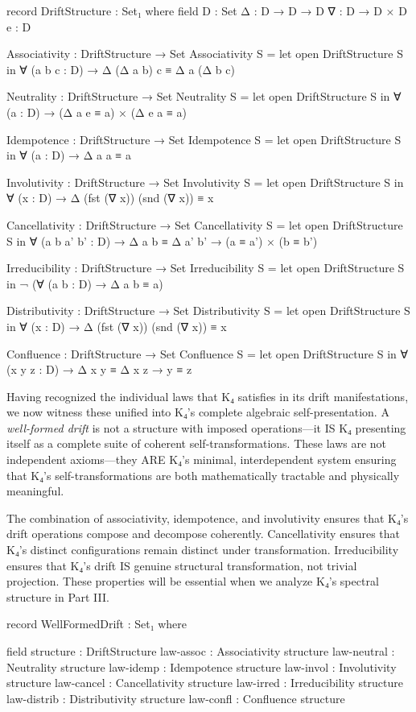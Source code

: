 \documentclass[11pt,a4paper]{book}
\begin{document}
\begin{code}
record DriftStructure : Set₁ where
  field
    D : Set
    Δ : D → D → D
    ∇ : D → D × D
    e : D

Associativity : DriftStructure → Set
Associativity S = let open DriftStructure S in
  ∀ (a b c : D) → Δ (Δ a b) c ≡ Δ a (Δ b c)

Neutrality : DriftStructure → Set
Neutrality S = let open DriftStructure S in
  ∀ (a : D) → (Δ a e ≡ a) × (Δ e a ≡ a)

Idempotence : DriftStructure → Set
Idempotence S = let open DriftStructure S in
  ∀ (a : D) → Δ a a ≡ a

Involutivity : DriftStructure → Set
Involutivity S = let open DriftStructure S in
  ∀ (x : D) → Δ (fst (∇ x)) (snd (∇ x)) ≡ x

Cancellativity : DriftStructure → Set
Cancellativity S = let open DriftStructure S in
  ∀ (a b a' b' : D) → Δ a b ≡ Δ a' b' → (a ≡ a') × (b ≡ b')

Irreducibility : DriftStructure → Set
Irreducibility S = let open DriftStructure S in
  ¬ (∀ (a b : D) → Δ a b ≡ a)

Distributivity : DriftStructure → Set
Distributivity S = let open DriftStructure S in
  ∀ (x : D) → Δ (fst (∇ x)) (snd (∇ x)) ≡ x

Confluence : DriftStructure → Set
Confluence S = let open DriftStructure S in
  ∀ (x y z : D) → Δ x y ≡ Δ x z → y ≡ z
\end{code}

Having recognized the individual laws that K₄ satisfies in its drift manifestations, we now witness these unified into K₄'s complete algebraic self-presentation. A \emph{well-formed drift} is not a structure with imposed operations—it IS K₄ presenting itself as a complete suite of coherent self-transformations. These laws are not independent axioms—they ARE K₄'s minimal, interdependent system ensuring that K₄'s self-transformations are both mathematically tractable and physically meaningful.

The combination of associativity, idempotence, and involutivity ensures that K₄'s drift operations compose and decompose coherently. Cancellativity ensures that K₄'s distinct configurations remain distinct under transformation. Irreducibility ensures that K₄'s drift IS genuine structural transformation, not trivial projection. These properties will be essential when we analyze K₄'s spectral structure in Part III.

\begin{code}
record WellFormedDrift : Set₁ where

  field
    structure : DriftStructure
    law-assoc    : Associativity structure
    law-neutral  : Neutrality structure
    law-idemp    : Idempotence structure
    law-invol    : Involutivity structure
    law-cancel   : Cancellativity structure
    law-irred    : Irreducibility structure
    law-distrib  : Distributivity structure
    law-confl    : Confluence structure

\end{code}
\end{document}
